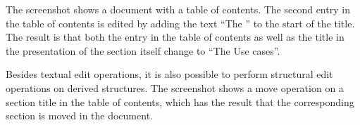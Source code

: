 The screenshot shows a document with a table of contents. The second entry in the table of contents is edited by adding the text ``The '' to the start of the title. The result is that both the entry in the table of contents as well as the title in the presentation of the section itself change to ``The Use cases''.


Besides textual edit operations, it is also possible to perform structural edit operations on derived structures. The screenshot shows a move operation on a section title in the table of contents, which has the result that the corresponding section is moved in the document.

